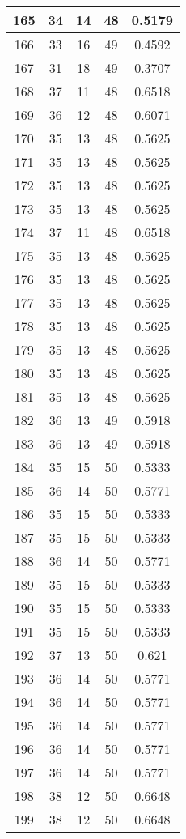 \documentclass[letterpaper, 12pt]{article}
\begin{document}
\begin{longtable}{|c|c|c|c|c|}
\hline
165 & 34 & 14 & 48 & 0.5179 \\
\hline
166 & 33 & 16 & 49 & 0.4592 \\
\hline
167 & 31 & 18 & 49 & 0.3707 \\
\hline
168 & 37 & 11 & 48 & 0.6518 \\
\hline
169 & 36 & 12 & 48 & 0.6071 \\
\hline
170 & 35 & 13 & 48 & 0.5625 \\
\hline
171 & 35 & 13 & 48 & 0.5625 \\
\hline
172 & 35 & 13 & 48 & 0.5625 \\
\hline
173 & 35 & 13 & 48 & 0.5625 \\
\hline
174 & 37 & 11 & 48 & 0.6518 \\
\hline
175 & 35 & 13 & 48 & 0.5625 \\
\hline
176 & 35 & 13 & 48 & 0.5625 \\
\hline
177 & 35 & 13 & 48 & 0.5625 \\
\hline
178 & 35 & 13 & 48 & 0.5625 \\
\hline
179 & 35 & 13 & 48 & 0.5625 \\
\hline
180 & 35 & 13 & 48 & 0.5625 \\
\hline
181 & 35 & 13 & 48 & 0.5625 \\
\hline
182 & 36 & 13 & 49 & 0.5918 \\
\hline
183 & 36 & 13 & 49 & 0.5918 \\
\hline
184 & 35 & 15 & 50 & 0.5333 \\
\hline
185 & 36 & 14 & 50 & 0.5771 \\
\hline
186 & 35 & 15 & 50 & 0.5333 \\
\hline
187 & 35 & 15 & 50 & 0.5333 \\
\hline
188 & 36 & 14 & 50 & 0.5771 \\
\hline
189 & 35 & 15 & 50 & 0.5333 \\
\hline
190 & 35 & 15 & 50 & 0.5333 \\
\hline
191 & 35 & 15 & 50 & 0.5333 \\
\hline
192 & 37 & 13 & 50 & 0.621 \\
\hline
193 & 36 & 14 & 50 & 0.5771 \\
\hline
194 & 36 & 14 & 50 & 0.5771 \\
\hline
195 & 36 & 14 & 50 & 0.5771 \\
\hline
196 & 36 & 14 & 50 & 0.5771 \\
\hline
197 & 36 & 14 & 50 & 0.5771 \\
\hline
198 & 38 & 12 & 50 & 0.6648 \\
\hline
199 & 38 & 12 & 50 & 0.6648 \\
\hline
\end{longtable}
\end{document}

